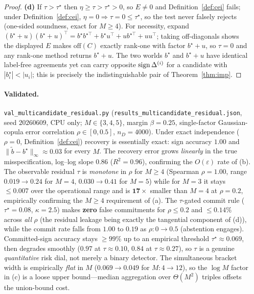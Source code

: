 \begin{proof}
\textbf{(d)} If $\tau>\tau^\star$ then $\eta\ge\tau>\tau^\star>0$, so $E\neq0$ and
Definition~\ref{def:cei} fails; under Definition~\ref{def:cei}, $\eta=0\Rightarrow
\tau=0\le\tau^\star$, so the test never falsely rejects (one-sided soundness,
exact for $M\ge4$). For necessity, expand
$(b^\star{+}u)(b^\star{+}u)^\top=b^\star b^{\star\top}+b^\star u^\top+ub^{\star\top}
+uu^\top$; taking off-diagonals shows the displayed $E$ makes $\mathrm{off}(C)$
exactly rank-one with factor $b^\star+u$, so $\tau=0$ and any rank-one method
returns $b^\star+u$. The two worlds $b^\star$ and $b^\star+u$ have identical
label-free agreements yet can carry opposite $\operatorname{sign}\Delta^{(i)}$ for a candidate
with $|b_i^\star|<|u_i|$; this is precisely the indistinguishable pair of
Theorem~\ref{thm:imp}. \qedhere
\end{proof}

\paragraph{Validated.} \texttt{val\_multicandidate\_residual.py}
(\texttt{results\_multicandidate\_residual.json}, seed $20260609$, CPU only;
$M{\in}\{3,4,5\}$, margin $\beta{=}0.25$, single-factor Gaussian-copula error
correlation $\rho\in[0,0.5]$, $n_D{=}4000$). Under exact independence
($\rho{=}0$, Definition~\ref{def:cei}) recovery is essentially exact: sign
accuracy $1.00$ and $\|\widetilde b-b^\star\|_\infty\approx0.03$ for every $M$.
The recovery error grows \emph{linearly} in the true misspecification, log--log
slope $\mathbf{0.86}$ ($R^2{=}0.96$), confirming the $O(\varepsilon)$ rate of
(b). The observable residual $\tau$ is \emph{monotone} in $\rho$ for $M\ge4$
(Spearman $\rho{=}\mathbf{1.00}$, range $0.019\!\to\!0.24$ for $M{=}4$,
$0.030\!\to\!0.41$ for $M{=}5$) while for $M{=}3$ it stays $\le0.007$ over the
operational range and is $\mathbf{17\times}$ smaller than $M{=}4$ at
$\rho{=}0.2$, empirically confirming the $M{\ge}4$ requirement of (a). The
$\tau$-gated commit rule ($\tau^\star{=}0.08$, $\kappa{=}2.5$) makes
\textbf{zero} false commitments for $\rho\le0.2$ and $\le0.14\%$ across
\emph{all} $\rho$ (the residual leakage being exactly the tangential component of
(d)), while the commit rate falls from $1.00$ to $0.19$ as $\rho{:}0\to0.5$
(abstention engages). Committed-sign accuracy stays $\ge99\%$ up to an empirical
threshold $\tau^\star\!\approx\!\mathbf{0.069}$, then degrades smoothly
($0.97$ at $\tau{\approx}0.10$, $0.84$ at $\tau{\approx}0.27$), so $\tau$ is a
genuine \emph{quantitative} risk dial, not merely a binary detector. The
simultaneous bracket width is empirically \emph{flat} in $M$
($0.069\!\to\!0.049$ for $M{:}4\to12$), so the $\log M$ factor in (c) is a loose
upper bound---median aggregation over $\Theta(M^2)$ triples offsets the
union-bound cost.


